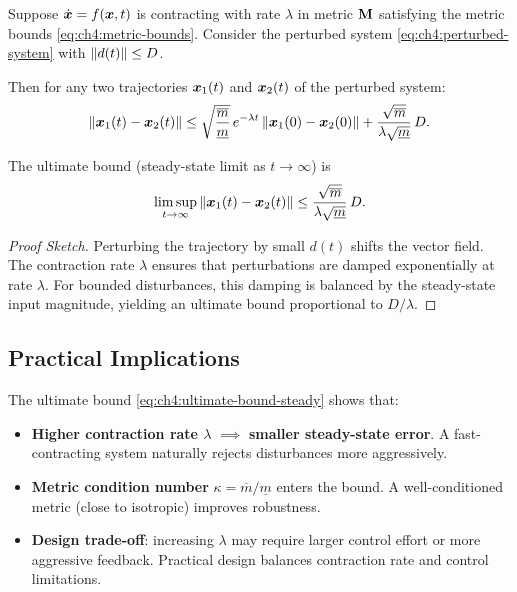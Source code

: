\begin{theorem}
\label{thm:ch4:disturbance-rejection}
Suppose $\dot{\bm{x}} = f(\bm{x},t)$ is contracting with rate $\lambda$ in metric $\mathbf{M}$
satisfying the metric bounds \eqref{eq:ch4:metric-bounds}. Consider the perturbed system
\eqref{eq:ch4:perturbed-system} with $\left\lVert d(t) \right\rVert \leq D$.

Then for any two trajectories $\bm{x}_1(t)$ and $\bm{x}_2(t)$ of the perturbed system:
\begin{equation}
\left\lVert \bm{x}_1(t) - \bm{x}_2(t) \right\rVert \leq \sqrt{\frac{\overline{m}}{\underline{m}}} \, e^{-\lambda t}
\left\lVert \bm{x}_1(0) - \bm{x}_2(0) \right\rVert + \frac{\sqrt{\overline{m}}}{\lambda\sqrt{\underline{m}}} \, D.
\label{eq:ch4:ultimate-bound}
\end{equation}

The ultimate bound (steady-state limit as $t \to \infty$) is
\begin{equation}
\limsup_{t\to\infty} \left\lVert \bm{x}_1(t) - \bm{x}_2(t) \right\rVert \leq \frac{\sqrt{\overline{m}}}{\lambda\sqrt{\underline{m}}} \, D.
\label{eq:ch4:ultimate-bound-steady}
\end{equation}
\end{theorem}

\begin{proof}[Proof Sketch]
Perturbing the trajectory by small $d(t)$ shifts the vector field. The contraction rate
$\lambda$ ensures that perturbations are damped exponentially at rate $\lambda$. For
bounded disturbances, this damping is balanced by the steady-state input magnitude,
yielding an ultimate bound proportional to $D/\lambda$.
\end{proof}

\subsection{Practical Implications}

The ultimate bound \eqref{eq:ch4:ultimate-bound-steady} shows that:

\begin{itemize}
\item \textbf{Higher contraction rate $\lambda$ } $\implies$ \textbf{smaller steady-state error}.
      A fast-contracting system naturally rejects disturbances more aggressively.
\item \textbf{Metric condition number } $\kappa = \overline{m}/\underline{m}$ enters
      the bound. A well-conditioned metric (close to isotropic) improves robustness.
\item \textbf{Design trade-off}: increasing $\lambda$ may require larger control effort
      or more aggressive feedback. Practical design balances contraction rate and
      control limitations.
\end{itemize}

